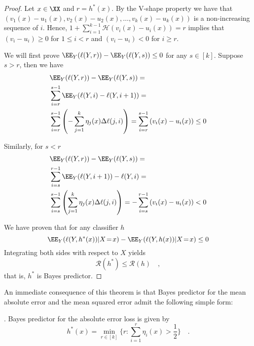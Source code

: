\begin{proof}
Let $x \in \XX$ and $r = h^*(x)$. By the V-shape property we have that  $(v_1(x) - u_1(x), v_2(x) - u_2(x), \ldots, v_k(x) - u_k(x))$ is a non-increasing sequence of $i$. Hence, $1 + \sum_{i=1}^{k-1} \mathcal{H}(v_i (x) - u_i(x)) = r$ implies that $(v_i - u_i) \geq 0$ for $1 \leq i < r$ and $(v_i - u_i) < 0$ for $i \geq r$. 

We will first prove $\EE_Y(\ell(Y, r)) - \EE_Y(\ell(Y, s)) \leq 0$ for any $s \in [k]$. Suppose $s > r$, then we have
$$
\begin{aligned}
&\EE_Y(\ell(Y, r)) - \EE_Y(\ell(Y, s)) = \\
&\sum_{i=r}^{s-1}\EE_Y(\ell(Y, i) - \ell(Y, i+1)) = \\
&\sum_{i=r}^{s-1}\left(-\sum_{j=1}^k \eta_j(x) \Delta\ell(j, i) \right) =
\sum_{i=r}^{s-1}\left( v_i(x) - u_i(x) \right) \leq 0 \\
\end{aligned}
$$


Similarly, for $s < r$
$$
\begin{aligned}
&\EE_Y(\ell(Y, r)) - \EE_Y(\ell(Y, s)) = \\
&\sum_{i=s}^{r-1}\EE_Y(\ell(Y, i+1)) - \ell(Y, i) = \\
&\sum_{i=s}^{s-1}\left(\sum_{j=1}^k \eta_j(x) \Delta\ell(j, i) \right) =
 - \sum_{i=s}^{r-1}\left( v_i(x) - u_i(x) \right) < 0 \\
\end{aligned}
$$

We have proven that for any classifier $h$
$$\EE_Y(\ell(Y, h^*(x))|X\!=\!x) - \EE_Y(\ell(Y, h(x))|X\!=\!x) \leq 0$$
Integrating both sides with respect to $X$ yields 
$$\mathcal{R}(h^*) \leq \mathcal{R}(h)\quad,$$ that is, $h^*$ is Bayes predictor. 
\end{proof}


An immediate consequence of this theorem is that Bayes predictor for the mean absolute error and the mean squared error admit the following simple form:




\begin{corollary}\label{cor:bayes_absolute}. Bayes predictor for the absolute error loss is given by
\begin{equation}\label{eq:bayes_absolute}
h^*(x) = \min_{r \in [k]} \{r : \sum_{i=1}^r \eta_i(x) > \frac{1}{2}\} \quad.
\end{equation}
\end{corollary}

